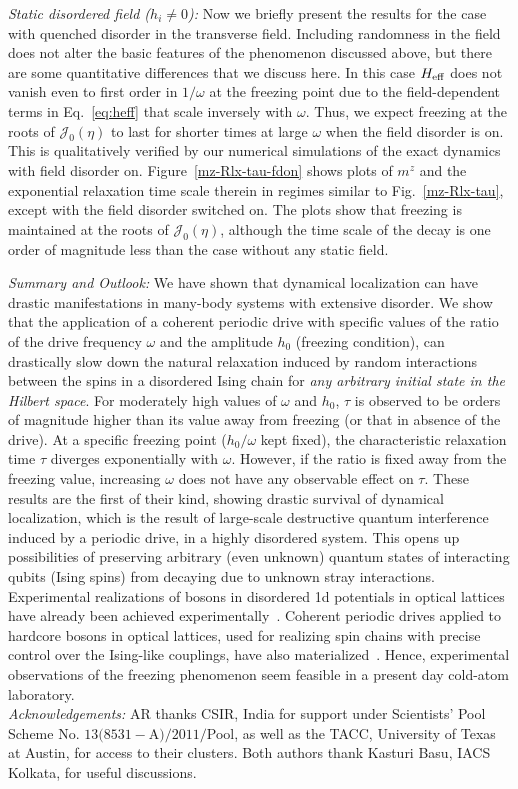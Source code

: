 \documentclass[reprint,preprintnumbers,showpacs,amsmath,twocolumn,showkeys,aps,prl]{revtex4-1}
\begin{document}
\noindent
{\it Static disordered field ($h_i\neq 0$):}
Now we briefly present the results for the case with quenched disorder in the transverse field.
Including randomness in the field does not alter the basic features of the phenomenon discussed above, 
but there are some quantitative differences that we discuss here. In this case $H_{\rm eff}$
does not vanish even to first order in $1/\omega$ at the freezing point due to the field-dependent 
terms in Eq.~\ref{eq:heff} that scale inversely with $\omega$. Thus, we expect freezing at the roots of 
$\mathcal{J}_0(\eta)$ to last for shorter times at large $\omega$ when the field 
disorder is on. This is qualitatively verified by our numerical simulations of the 
exact dynamics with field disorder on. Figure~\ref{mz-Rlx-tau-fdon} shows plots of $m^z$ and the 
exponential relaxation time scale therein in regimes similar to Fig.~\ref{mz-Rlx-tau}, except with 
the field disorder switched on. The plots show that freezing is maintained at the roots of 
$\mathcal{J}_0(\eta)$, although the time scale of the decay is one order of magnitude less than the 
case without any static field.

\noindent
{\it Summary and Outlook:}
We have shown that dynamical localization can have drastic manifestations in many-body systems with
extensive disorder. We show that the application of a coherent periodic drive with specific values of the ratio 
of the drive frequency $\omega$ and the amplitude $h_{0}$ (freezing condition), can drastically slow 
down the natural relaxation induced by random interactions between the spins in a disordered Ising chain
for {\it any arbitrary initial state in the Hilbert space}. 
For moderately high values of $\omega$ and $h_{0}$, $\tau$ is observed to be orders of magnitude higher 
than its value away from freezing (or that in absence of the drive). At a specific freezing point 
($h_{0}/\omega$ kept fixed), the characteristic relaxation time $\tau$ diverges exponentially with 
$\omega$. However, if the ratio is fixed away from the freezing value, increasing $\omega$
does not have any observable effect on $\tau.$ These results are the first of their kind, showing drastic survival of 
dynamical localization, which is the result of large-scale destructive quantum interference induced by a 
periodic drive, in a highly disordered system. This opens up possibilities of preserving arbitrary (even unknown) 
quantum states of interacting qubits (Ising spins) from decaying due to unknown stray interactions.   
Experimental realizations of bosons in disordered 1d potentials in optical lattices have already been achieved 
experimentally~\cite{Disordered-Bosons,Bloch-Nat-Phys}. Coherent periodic drives applied to hardcore bosons
in optical lattices, used for realizing spin chains with precise control over the Ising-like
couplings, have also materialized~\cite{Bloch-Periodic}.
Hence, experimental observations of the freezing phenomenon seem feasible 
in a present day cold-atom laboratory.       \\
\noindent
{\it Acknowledgements:}
AR thanks CSIR, India for support under Scientists' Pool Scheme No. $13(8531-$A$)/2011/$Pool, as well as the TACC, University 
of Texas at Austin, for access to their clusters. Both authors thank Kasturi Basu, IACS Kolkata, for useful discussions.
\end{document}
